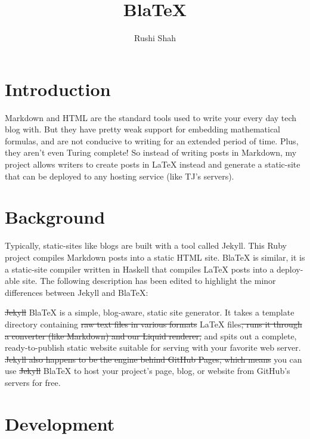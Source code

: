 \documentclass[jou,apacite]{apa6}
\title{BlaTeX}
\author{Rushi Shah}
\affiliation{TJHSST}
\begin{document}
\maketitle    
         
\section{Introduction}

Markdown and HTML are the standard tools used to write your every day tech blog with. But they have pretty weak support for embedding mathematical formulas, and are not conducive to writing for an extended period of time. Plus, they aren't even Turing complete! So instead of writing posts in Markdown, my project allows writers to create posts in LaTeX instead and generate a static-site that can be deployed to any hosting service (like TJ's servers).

\section{Background}

Typically, static-sites like blogs are built with a tool called Jekyll. This Ruby project compiles Markdown posts into a static HTML site. BlaTeX is similar, it is a static-site compiler written in Haskell that compiles LaTeX posts into a deploy-able site. The following description has been edited to highlight the minor differences between Jekyll and BlaTeX:

\sout{Jekyll} BlaTeX is a simple, blog-aware, static site generator. It takes a template directory containing \sout{raw text files in various formats} LaTeX files\sout{, runs it through a converter (like Markdown) and our Liquid renderer,} and spits out a complete, ready-to-publish static website suitable for serving with your favorite web server. \sout{Jekyll also happens to be the engine behind GitHub Pages, which means} you can use \sout{Jekyll} BlaTeX to host your project's page, blog, or website from GitHub's servers for free.

\section{Development}
\end{document}
